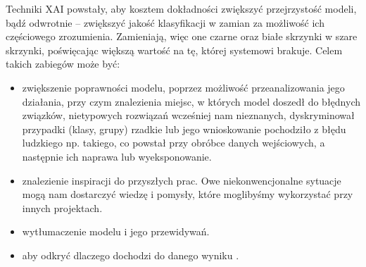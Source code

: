 Techniki XAI powstały, aby kosztem dokładności zwiększyć przejrzystość modeli, bądź odwrotnie – zwiększyć jakość klasyfikacji w zamian za możliwość ich częściowego zrozumienia. Zamieniają, więc one czarne oraz białe skrzynki w szare skrzynki, poświęcając większą wartość na tę, której systemowi brakuje. Celem takich zabiegów może być: 
\begin{itemize}
    \item zwiększenie poprawności modelu, poprzez możliwość przeanalizowania jego działania, przy czym znalezienia miejsc, w których model doszedł do błędnych związków, nietypowych rozwiązań wcześniej nam nieznanych, dyskryminował przypadki (klasy, grupy) rzadkie lub jego wnioskowanie pochodziło z błędu ludzkiego np. takiego, co powstał przy obróbce danych wejściowych, a następnie ich naprawa lub wyeksponowanie. 
    \item znalezienie inspiracji do przyszłych prac. Owe niekonwencjonalne sytuacje mogą nam dostarczyć wiedzę i pomysły, które moglibyśmy wykorzystać przy innych projektach.
    \item wytłumaczenie modelu i jego przewidywań.
    \item aby odkryć dlaczego dochodzi do danego wyniku \cite{molnar2025}.
\end{itemize}
